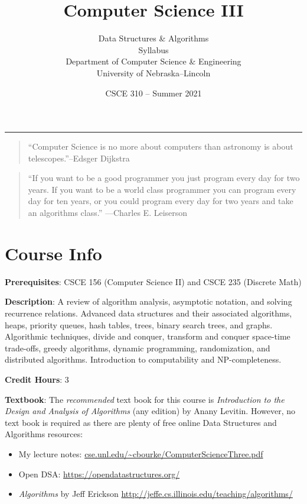 \documentclass[12pt]{scrartcl}
\title{Computer Science III}\let\Title\@title
\subtitle{Data Structures \& Algorithms\\Syllabus\\
{\small
\vskip1cm
Department of Computer Science \& Engineering \\
University of Nebraska--Lincoln}
\vskip-1cm}
\date{CSCE 310 -- Summer 2021}
\begin{document}
\maketitle


\hrule

\begin{quote}
``Computer Science is no more about computers than astronomy is about telescopes.''\hfill --Edsger Dijkstra
\end{quote}

\begin{quote}

``If you want to be a good programmer you just program every day for two years. 
If you want to be a world class programmer you can program every day for ten 
years, or you could program every day for two years and take an algorithms 
class.''
\hfill ---Charles E. Leiserson
\end{quote}


\section{Course Info}

\textbf{Prerequisites}: CSCE 156 (Computer Science II) and CSCE 235 (Discrete Math)

\textbf{Description}: A review of algorithm analysis, asymptotic notation, 
and solving recurrence relations. Advanced data structures and their 
associated algorithms, heaps, priority queues, hash tables, trees, binary 
search trees, and graphs. Algorithmic techniques, divide and conquer, 
transform and conquer space-time trade-offs, greedy algorithms, dynamic 
programming, randomization, and distributed algorithms. Introduction to 
computability and NP-completeness.

\textbf{Credit Hours}: 3

\textbf{Textbook}: The \emph{recommended} text book for this course is
\emph{Introduction to the Design and Analysis of Algorithms} (any edition)
by Anany Levitin.  However, no text book is required as there are plenty 
of free online Data Structures and Algorithms resources:
\begin{itemize}
  \item My lecture notes: \url{cse.unl.edu/~cbourke/ComputerScienceThree.pdf}
  \item Open DSA: \url{https://opendatastructures.org/}
  \item \emph{Algorithms} by Jeff Erickson \url{http://jeffe.cs.illinois.edu/teaching/algorithms/}
\end{itemize}
\end{document}
